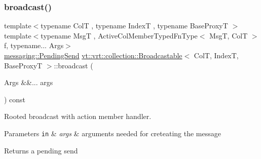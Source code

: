 \mbox{\label{structvt_1_1vrt_1_1collection_1_1_broadcastable_a96cd21a1be6313144a8c4aa3683eaa05}} 
\subsubsection{\texorpdfstring{broadcast()}{broadcast()}\hspace{0.1cm}{\footnotesize\ttfamily [6/6]}}
{\footnotesize\ttfamily template$<$typename ColT , typename IndexT , typename Base\+ProxyT $>$ \\
template$<$typename MsgT , Active\+Col\+Member\+Typed\+Fn\+Type$<$ Msg\+T, Col\+T $>$ f, typename... Args$>$ \\
\hyperlink{structvt_1_1messaging_1_1_pending_send}{messaging\+::\+Pending\+Send} \hyperlink{structvt_1_1vrt_1_1collection_1_1_broadcastable}{vt\+::vrt\+::collection\+::\+Broadcastable}$<$ ColT, IndexT, Base\+ProxyT $>$\+::broadcast (\begin{DoxyParamCaption}\item[{Args \&\&...}]{args }\end{DoxyParamCaption}) const}



Rooted broadcast with action member handler. 


\begin{DoxyParams}[1]{Parameters}
\mbox{\tt in}  & {\em args} & arguments needed for creteating the message\\
\hline
\end{DoxyParams}
\begin{DoxyReturn}{Returns}
a pending send 
\end{DoxyReturn}
\mbox{\label{structvt_1_1vrt_1_1collection_1_1_broadcastable_acef03dd57082f32556bef0e536a07fe9}} 
